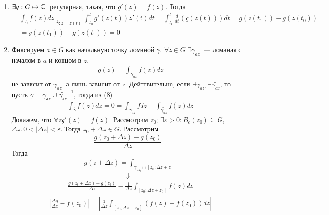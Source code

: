 \begin{enumerate}
    \item $\exists g:G \mapsto \mathbb{C}$, регулярная, такая, что $g'(z) = f(z)$.
    Тогда
        \begin{align*}
          & \int_{\overset{\circ}{\gamma}} f(z) dz \underset{\overset{\circ}{\gamma}: z = z(t)}{=} \int_{t_0}^{t_1} g'(z(t))z'(t)dt = \int_{t_0}^{t_1}\frac{d}{dt}(g(z(t)))dt = g(z(t_1)) - g(z(t_0)) = \\
          & = g(z(t_1)) - g(z(t_1)) = 0
    \end{align*}
    \item Фиксируем $a \in G$ как начальную точку ломаной $\gamma$. $\forall z
    \in G$ $\exists \gamma_{az}$~--- ломаная с началом в $a$ и концом в $z$.
        \begin{align*}
          & g(z) = \int_{\gamma_{az}} f(z) dz
        \end{align*}
        не зависит от $\gamma_{az}$, а лишь зависит от $z$. Действительно, если
        $\exists \gamma_{az}, \exists \tilde{\gamma_{az}}$, то пусть
        $\overset{\circ}{\gamma} = \gamma_{az} \cup \tilde{\gamma_{az}}^{-1}$,
        тогда из \hyperlink{(8)}{(8)}
        \begin{align*}
          & \int_{\overset{\circ}{\gamma}} f(z) dz = 0 = \int_{\gamma_{az}}f dz - \int_{\tilde{\gamma_{az}}}f(z)dz
        \end{align*}
        Докажем, что $\forall z g'(z) = f(z)$. Рассмотрим $z_0$; $\exists
        \varepsilon > 0: B_{\varepsilon}(z_0) \subseteq G$, $\Delta z: 0 <
        \left| \Delta z \right| < \varepsilon$. Тогда $z_0 + \Delta z \in G$.
        Рассмотрим
        $$\frac{g(z_0+\Delta z) - g(z_0)}{\Delta z}$$
        Тогда
        \begin{align*}
          & g(z+ \Delta z) = \int_{\gamma_{az_0} \cap [z_0; \Delta z + z_0]}
        \end{align*}
        $$\Downarrow$$
 \begin{align*}
          & \frac{g(z_0+ \Delta z) - g(z_0)}{\Delta z} = \frac{1}{\Delta z} \int_{[z_0; \Delta z + z_0]} f(z)dz
 \end{align*}
  \begin{align*}
          & \left| \frac{\Delta g}{\Delta z} - f(z_0) \right| = \left| \frac{1}{\Delta z} \int_{[z_0; \Delta z + z_0]}(f(z) - f(z_0))dz \right|
        \end{align*}    
\end{enumerate}
